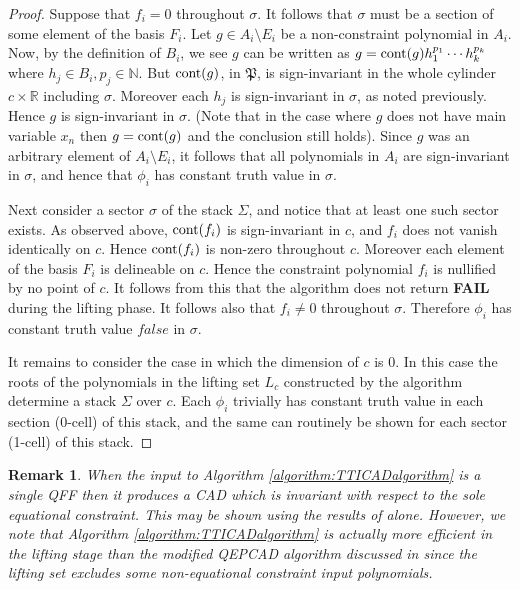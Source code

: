 \documentclass{article}
\def\R {\ensuremath{\mathbb{R}}}
\newtheorem{remark}[theorem]{Remark}
\begin{document}
\begin{proof}
Suppose that $f_i = 0$ throughout $\sigma$.
It follows that $\sigma$ must be a section of some element of the basis $F_i$.
Let $g \in A_i \setminus E_i$ be a non-constraint polynomial in $A_i$.
Now, by the definition of $B_i$, we see $g$ can be written as 
$g = {\rm cont}(g) h_1^{p_1} \cdots h_k^{p_k}$ where $h_j \in B_i, p_j \in \mathbb{N}$. 
But ${\rm cont}(g)$, in $\mathfrak{P}$,
is sign-invariant in the whole cylinder $c \times \R$ including $\sigma$.
Moreover each $h_j$ is sign-invariant in $\sigma$, as noted previously.
Hence $g$ is sign-invariant in $\sigma$.  (Note that in the case where $g$ does not have main variable $x_n$ then $g = {\rm cont}(g)$ and the conclusion still holds).
Since $g$ was an arbitrary element of $A_i \setminus E_i$,
it follows that all polynomials in $A_i$ are sign-invariant in $\sigma$,
and hence that $\phi_i$ has constant truth value in $\sigma$.

Next consider a sector $\sigma$ of the stack $\Sigma$, and notice that
at least one such sector exists.
As observed above, ${\rm cont}(f_i)$ is sign-invariant in $c$,
and $f_i$ does not vanish identically on $c$.
Hence ${\rm cont}(f_i)$ is non-zero throughout $c$. Moreover
each element of the basis $F_i$ is delineable on $c$.
Hence the constraint polynomial $f_i$ is nullified by no point of $c$.
It follows from this that the algorithm does not return \textbf{FAIL}
during the lifting phase.
It follows also that $f_i \neq 0$ throughout $\sigma$.
Therefore $\phi_i$ has constant truth value $false$ in $\sigma$.

It remains to consider the case in which the dimension of $c$ is 0.
In this case the roots of the polynomials in the lifting set $L_c$ constructed
by the algorithm determine a stack $\Sigma$ over $c$.
Each $\phi_i$ trivially has constant truth
value in each section (0-cell) of this stack,
and the same can routinely be shown for each sector (1-cell) of this stack.
\end{proof}

\begin{remark}
When the input to Algorithm \ref{algorithm:TTICADalgorithm} is a single QFF then it produces a CAD which is invariant with respect to the sole equational constraint.  This may be shown using the results of \cite{McCallum1999a} alone.  However, we note that  Algorithm \ref{algorithm:TTICADalgorithm} is actually more efficient in the lifting stage than the modified QEPCAD algorithm discussed in \cite{McCallum1999a} since the lifting set excludes some non-equational constraint input polynomials.
\end{remark} 
\end{document}
